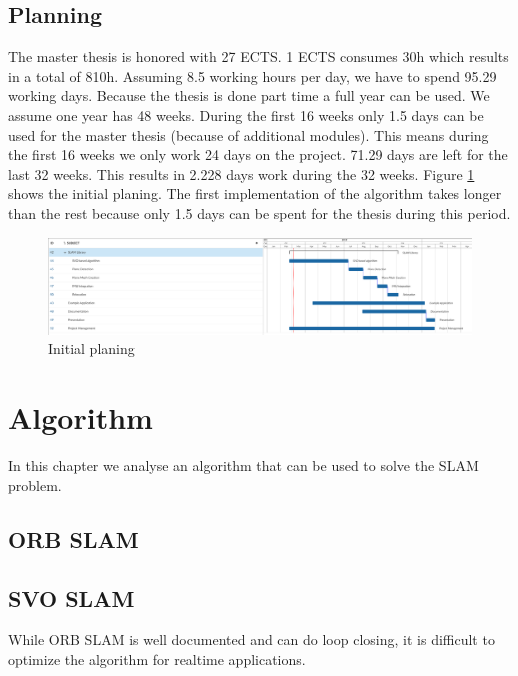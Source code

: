 \documentclass[11pt,a4paper,titlepage,oneside]{report}
\begin{document}
\section{Planning}
The master thesis is honored with 27 ECTS. 1 ECTS consumes 30h which results in a total of 810h. Assuming 8.5 working hours per day, we have to spend 95.29 working days. Because the thesis is done part time a full year can be used. We assume one year has 48 weeks. During the first 16 weeks only 1.5 days can be used for the master thesis (because of additional modules). This means during the first 16 weeks we only work 24 days on the project. 71.29 days are left for the last 32 weeks. This results in 2.228 days work during the 32 weeks. Figure \ref{fig:gantt} shows the initial planing. The first implementation of the algorithm takes longer than the rest because only 1.5 days can be spent for the thesis during this period.

\begin{figure}[H]
	\includegraphics[width=1.0\textwidth]{img/gantt.png}
	\caption{Initial planing}\label{fig:gantt}
\end{figure}

\chapter{Algorithm}
In this chapter we analyse an algorithm that can be used to solve the SLAM problem.

\section{ORB SLAM}

\section{SVO SLAM}
While ORB SLAM is well documented and can do loop closing, it is difficult to optimize the algorithm for realtime applications.
\end{document}
